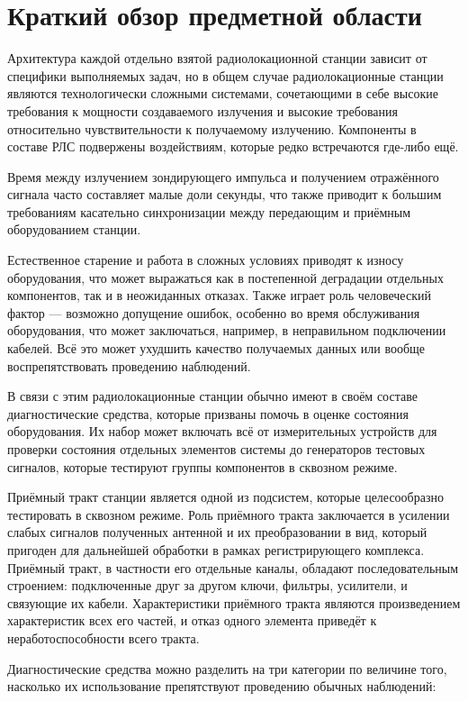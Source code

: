 \documentclass{report}
\begin{document}
\section{Краткий обзор предметной области}

Архитектура каждой отдельно взятой радиолокационной станции зависит от специфики выполняемых задач, но в общем случае радиолокационные станции являются технологически сложными системами, сочетающими в себе высокие требования к мощности создаваемого излучения и высокие требования относительно чувствительности к получаемому излучению. Компоненты в составе РЛС подвержены воздействиям, которые редко встречаются где-либо ещё.

Время между излучением зондирующего импульса и получением отражённого сигнала часто составляет малые доли секунды, что также приводит к большим требованиям касательно синхронизации между передающим и приёмным оборудованием станции.

Естественное старение и работа в сложных условиях приводят к износу оборудования, что может выражаться как в постепенной деградации отдельных компонентов, так и в неожиданных отказах. Также играет роль человеческий фактор --- возможно допущение ошибок, особенно во время обслуживания оборудования, что может заключаться, например, в неправильном подключении кабелей. Всё это может ухудшить качество получаемых данных или вообще воспрепятствовать проведению наблюдений.

В связи с этим радиолокационные станции обычно имеют в своём составе диагностические средства, которые призваны помочь в оценке состояния оборудования. Их набор может включать всё от измерительных устройств для проверки состояния отдельных элементов системы до генераторов тестовых сигналов, которые тестируют группы компонентов в сквозном режиме.

Приёмный тракт станции является одной из подсистем, которые целесообразно тестировать в сквозном режиме. Роль приёмного тракта заключается в усилении слабых сигналов полученных антенной и их преобразовании в вид, который пригоден для дальнейшей обработки в рамках регистрирующего комплекса. Приёмный тракт, в частности его отдельные каналы, обладают последовательным строением: подключенные друг за другом ключи, фильтры, усилители, и связующие их кабели. Характеристики приёмного тракта являются произведением характеристик всех его частей, и отказ одного элемента приведёт к неработоспособности всего тракта.

Диагностические средства можно разделить на три категории по величине того, насколько их использование препятствуют проведению обычных наблюдений:
\end{document}
